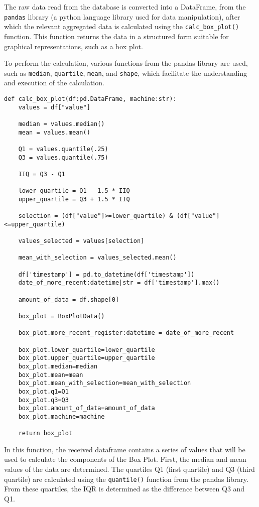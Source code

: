 The raw data read from the database is converted into a DataFrame, from the \texttt{pandas} library \cite{pandasDocs} (a python language library used for data manipulation), after which the relevant aggregated data is calculated using the \texttt{calc\_box\_plot()} function. This function returns the data in a structured form suitable for graphical representations, such as a box plot.

To perform the calculation, various functions from the pandas library are used, such as \texttt{median}, \texttt{quartile}, \texttt{mean}, and \texttt{shape}, which facilitate the understanding and execution of the calculation.

\begin{Verbatim}[fontsize=\small, baselinestretch=0.8]
def calc_box_plot(df:pd.DataFrame, machine:str):
    values = df["value"]

    median = values.median()
    mean = values.mean()

    Q1 = values.quantile(.25)
    Q3 = values.quantile(.75)

    IIQ = Q3 - Q1

    lower_quartile = Q1 - 1.5 * IIQ
    upper_quartile = Q3 + 1.5 * IIQ
    
    selection = (df["value"]>=lower_quartile) & (df["value"]<=upper_quartile)

    values_selected = values[selection]

    mean_with_selection = values_selected.mean()

    df['timestamp'] = pd.to_datetime(df['timestamp'])
    date_of_more_recent:datetime|str = df['timestamp'].max()

    amount_of_data = df.shape[0]

    box_plot = BoxPlotData()

    box_plot.more_recent_register:datetime = date_of_more_recent

    box_plot.lower_quartile=lower_quartile
    box_plot.upper_quartile=upper_quartile
    box_plot.median=median
    box_plot.mean=mean
    box_plot.mean_with_selection=mean_with_selection
    box_plot.q1=Q1
    box_plot.q3=Q3
    box_plot.amount_of_data=amount_of_data
    box_plot.machine=machine

    return box_plot
\end{Verbatim}

In this function, the received dataframe contains a series of values that will be used to calculate the components of the Box Plot. First, the median and mean values of the data are determined. The quartiles Q1 (first quartile) and Q3 (third quartile) are calculated using the \texttt{quantile()} function from the pandas library. From these quartiles, the \gls{IQR} is determined as the difference between Q3 and Q1.


